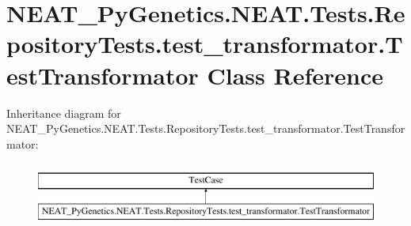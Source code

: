 \hypertarget{classNEAT__PyGenetics_1_1NEAT_1_1Tests_1_1RepositoryTests_1_1test__transformator_1_1TestTransformator}{}\section{N\+E\+A\+T\+\_\+\+Py\+Genetics.\+N\+E\+A\+T.\+Tests.\+Repository\+Tests.\+test\+\_\+transformator.\+Test\+Transformator Class Reference}
\label{classNEAT__PyGenetics_1_1NEAT_1_1Tests_1_1RepositoryTests_1_1test__transformator_1_1TestTransformator}
Inheritance diagram for N\+E\+A\+T\+\_\+\+Py\+Genetics.\+N\+E\+A\+T.\+Tests.\+Repository\+Tests.\+test\+\_\+transformator.\+Test\+Transformator\+:\begin{figure}[H]
\begin{center}
\leavevmode
\includegraphics[height=2.000000cm]{classNEAT__PyGenetics_1_1NEAT_1_1Tests_1_1RepositoryTests_1_1test__transformator_1_1TestTransformator}
\end{center}
\end{figure}
